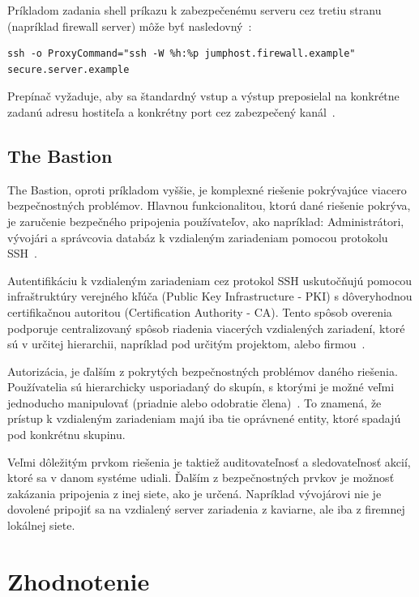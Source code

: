 Príkladom zadania shell príkazu k zabezpečenému serveru cez tretiu stranu (napríklad firewall server) môže byť nasledovný~\cite{ProxyCommand}:

\begin{Verbatim}[frame=single]
ssh -o ProxyCommand="ssh -W %h:%p jumphost.firewall.example"
secure.server.example
\end{Verbatim}

Prepínač  vyžaduje, aby sa štandardný vstup a výstup preposielal na konkrétne zadanú adresu hostiteľa
a konkrétny port cez zabezpečený kanál~\cite{SshMan}.

\subsection{The Bastion}\label{subsec:the-bastion}

The Bastion, oproti príkladom vyššie, je komplexné riešenie pokrývajúce viacero bezpečnostných problémov.
Hlavnou funkcionalitou, ktorú dané riešenie pokrýva, je zaručenie bezpečného pripojenia používateľov, ako napríklad:
Administrátori, vývojári a správcovia databáz k vzdialeným zariadeniam pomocou protokolu SSH~\cite{BastionOne}.

Autentifikáciu k vzdialeným zariadeniam cez protokol SSH uskutočňujú pomocou infraštruktúry verejného kľúča (Public Key
Infrastructure - PKI) s dôveryhodnou certifikačnou autoritou (Certification Authority - CA).
Tento spôsob overenia podporuje centralizovaný spôsob riadenia viacerých vzdialených zariadení, ktoré sú v určitej
hierarchii, napríklad pod určitým projektom, alebo firmou~\cite{BastionOne}.

Autorizácia, je ďalším z pokrytých bezpečnostných problémov daného riešenia.
Používatelia sú hierarchicky usporiadaný do skupín, s ktorými je možné veľmi jednoducho manipulovať (priadnie alebo
odobratie člena)~\cite{BastionTwo}.
To znamená, že prístup k vzdialeným zariadeniam majú iba tie oprávnené entity, ktoré spadajú pod konkrétnu skupinu.

Veľmi dôležitým prvkom riešenia je taktiež auditovateľnosť a sledovateľnosť akcií, ktoré sa v danom systéme udiali.
Ďalším z bezpečnostných prvkov je možnosť zakázania pripojenia z inej siete, ako je určená.
Napríklad vývojárovi nie je dovolené pripojiť sa na vzdialený server zariadenia z kaviarne, ale iba z firemnej lokálnej siete.

\section{Zhodnotenie}\label{sec:zhodnotenie}

